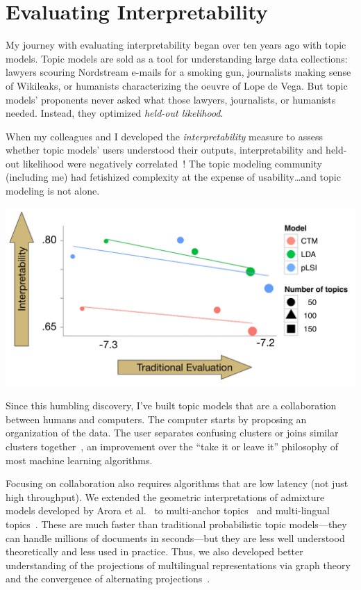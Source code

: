 \section{Evaluating Interpretability}

My journey with evaluating interpretability began over ten years ago
with topic models.
%
Topic models are sold as a tool for understanding large data
collections: lawyers scouring Nordstream e-mails for a smoking gun,
journalists making sense of Wikileaks, or humanists characterizing the
oeuvre of Lope de Vega.
%
But topic models' proponents never asked what those lawyers,
journalists, or humanists needed.
%
Instead, they optimized \emph{held-out likelihood}.

When my colleagues
and I developed the \emph{interpretability} measure to assess whether topic
models' users understood their outputs, interpretability and
held-out likelihood were negatively correlated~\cite{chang-09b}!
%
The topic modeling community (including me) had fetishized complexity
at the expense of usability\dots and topic modeling is not alone.

\begin{center}
\includegraphics[width=.5\linewidth]{images/prec_ll_4}
\end{center}

Since this humbling discovery, I've built topic models that are a
collaboration between humans and computers.  The computer starts by
proposing an organization of the data.  The user separates confusing
clusters or joins similar clusters together~\cite{hu-14:itm}, an
improvement over the ``take it or leave it'' philosophy of most
machine learning algorithms.

Focusing on collaboration also requires algorithms that are low
latency (not just high throughput). We extended the
geometric interpretations of admixture models developed by Arora et
al.~\cite{arora-12} to multi-anchor topics~\cite{lund-17} and
multi-lingual topics~\cite{Yuan-18}.
%
These are much faster than traditional probabilistic topic
models---they can handle millions of documents in seconds---but they
are less well understood theoretically and less used in practice.
%
Thus, we also developed better understanding of the projections of
multilingual representations via graph theory~\cite{Fujinuma-19} and
the convergence of alternating projections~\cite{Zhang-19}.

